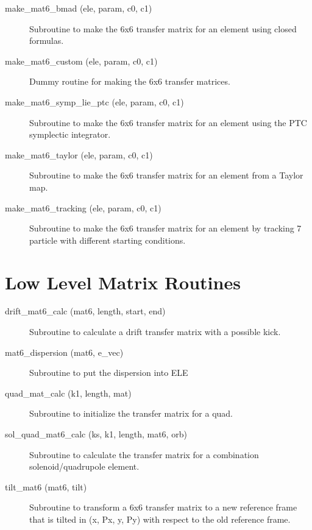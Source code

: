 \begin{description}

\item[make\_mat6\_bmad (ele, param, c0, c1)] \Newline
Subroutine to make the 6x6 transfer matrix for an element
using closed formulas.

\item[make\_mat6\_custom (ele, param, c0, c1)] \Newline
Dummy routine for making the 6x6 transfer matrices.

\item[make\_mat6\_symp\_lie\_ptc (ele, param, c0, c1)] \Newline
Subroutine to make the 6x6 transfer matrix for an element using
the PTC symplectic integrator.

\item[make\_mat6\_taylor (ele, param, c0, c1)] \Newline
Subroutine to make the 6x6 transfer matrix for an element
from a Taylor map.

\item[make\_mat6\_tracking (ele, param, c0, c1)] \Newline
Subroutine to make the 6x6 transfer matrix for an element by 
tracking 7 particle with different starting conditions.

\end{description}

\section{Low Level Matrix Routines}
\label{r:low_mat}  

\begin{description}

\item[drift\_mat6\_calc (mat6, length, start, end)] \Newline
Subroutine to calculate a drift transfer matrix with a possible kick. 

\item[mat6\_dispersion (mat6, e\_vec)] \Newline
Subroutine to put the dispersion into ELE%

\item[quad\_mat\_calc (k1, length, mat)] \Newline
Subroutine to initialize the transfer matrix for a quad.

\item[sol\_quad\_mat6\_calc (ks, k1, length, mat6, orb)] \Newline
Subroutine to calculate the transfer matrix for a combination solenoid/quadrupole element. 

\item[tilt\_mat6 (mat6, tilt)] \Newline
Subroutine to transform a 6x6 transfer matrix to a new reference frame that is 
tilted in (x, Px, y, Py) with respect to the old reference frame. 

\end{description}

